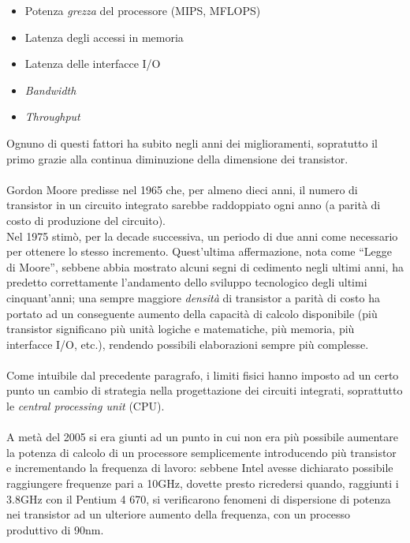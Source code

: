 \begin{itemize}
\item Potenza \emph{grezza} del processore (MIPS, MFLOPS)
\item Latenza degli accessi in memoria
\item Latenza delle interfacce I/O
\item \textit{Bandwidth}
\item \textit{Throughput}
\end{itemize}
  Ognuno di questi fattori ha subito negli anni dei miglioramenti, sopratutto il
primo grazie alla continua diminuzione della dimensione dei transistor. 
\\ \\
Gordon Moore predisse nel 1965\citep{GMoore} che, 
per almeno dieci anni, il numero di transistor in un circuito integrato 
sarebbe raddoppiato ogni anno (a parità di costo di produzione del circuito). \\
Nel 1975 stimò, per la decade successiva, un periodo di due anni come 
necessario per ottenere lo stesso incremento. Quest'ultima affermazione, 
nota come ``Legge di Moore'', sebbene abbia mostrato alcuni segni di
cedimento negli ultimi anni\citep{MooresLaw}, ha 
predetto correttamente l'andamento dello sviluppo tecnologico degli ultimi
cinquant'anni; una sempre maggiore \emph{densità} di transistor a parità
di costo ha portato ad un conseguente aumento della capacità di calcolo 
disponibile (più transistor significano più unità logiche e matematiche,
più memoria, più interfacce I/O, etc.), rendendo possibili elaborazioni
sempre più complesse. 
\\ \\
Come intuibile dal precedente paragrafo, i limiti fisici hanno imposto ad un 
certo punto un cambio di strategia nella progettazione dei circuiti integrati,
soprattutto le \emph{central processing unit} (CPU).
\\ \\
A metà del 2005 si era giunti ad un punto in cui non era più possibile 
aumentare la potenza di calcolo di un processore semplicemente introducendo
più transistor e incrementando la frequenza di lavoro: sebbene Intel avesse 
dichiarato possibile raggiungere frequenze pari a 10GHz, dovette presto 
ricredersi quando, raggiunti i 3.8GHz con il Pentium 4 670, si verificarono 
fenomeni di dispersione di potenza nei transistor ad un ulteriore aumento della 
frequenza, con un processo produttivo di 90nm. \\
